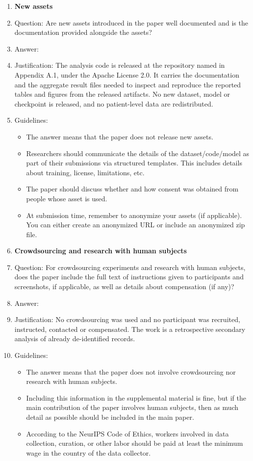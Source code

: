 \begin{enumerate}
\item {\bf New assets}
    \item[] Question: Are new assets introduced in the paper well documented and is the documentation provided alongside the assets?
    \item[] Answer: \answerYes{}
    \item[] Justification: The analysis code is released at the repository named in Appendix A.1, under the Apache License 2.0. It carries the documentation and the aggregate result files needed to inspect and reproduce the reported tables and figures from the released artifacts. No new dataset, model or checkpoint is released, and no patient-level data are redistributed.
    \item[] Guidelines:
    \begin{itemize}
        \item The answer \answerNA{} means that the paper does not release new assets.
        \item Researchers should communicate the details of the dataset\slash code\slash model as part of their submissions via structured templates. This includes details about training, license, limitations, etc. 
        \item The paper should discuss whether and how consent was obtained from people whose asset is used.
        \item At submission time, remember to anonymize your assets (if applicable). You can either create an anonymized URL or include an anonymized zip file.
    \end{itemize}

\item {\bf Crowdsourcing and research with human subjects}
    \item[] Question: For crowdsourcing experiments and research with human subjects, does the paper include the full text of instructions given to participants and screenshots, if applicable, as well as details about compensation (if any)? 
    \item[] Answer: \answerNA{}
    \item[] Justification: No crowdsourcing was used and no participant was recruited, instructed, contacted or compensated. The work is a retrospective secondary analysis of already de-identified records.
    \item[] Guidelines:
    \begin{itemize}
        \item The answer \answerNA{} means that the paper does not involve crowdsourcing nor research with human subjects.
        \item Including this information in the supplemental material is fine, but if the main contribution of the paper involves human subjects, then as much detail as possible should be included in the main paper. 
        \item According to the NeurIPS Code of Ethics, workers involved in data collection, curation, or other labor should be paid at least the minimum wage in the country of the data collector. 
    \end{itemize}


\end{enumerate}
